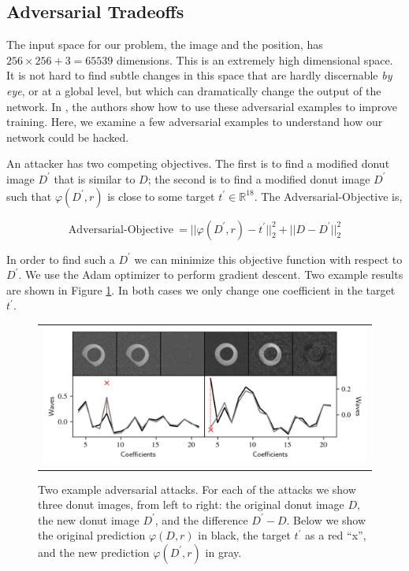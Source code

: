 \subsection{Adversarial Tradeoffs}

The input space for our problem, the image and the position, has $256 \times 256 + 3 = 65539$ dimensions. This is an extremely high dimensional space. It is not hard to find subtle changes in this space that are hardly discernable \textit{by eye}, or at a global level, but which can dramatically change the output of the network. In \cite{2014arXiv1412.6572G}, the authors show how to use these adversarial examples to improve training. Here, we examine a few adversarial examples to understand how our network could be hacked. 

An attacker has two competing objectives. The first is to find a modified donut image $D^\prime$ that is similar to $D$; the second is to find a modified donut image $D^\prime$ such that $\varphi(D^\prime, r)$ is close to some target $t^\prime \in \mathbb{R}^{18}$. The Adversarial-Objective is,

\begin{equation*}
\text{Adversarial-Objective}\ = ||\varphi(D^\prime, r) - t^\prime||_2^2 + ||D - D^\prime||_2^2
\end{equation*}

\noindent In order to find such a $D^\prime$ we can minimize this objective function with respect to $D^\prime$. We use the Adam optimizer to perform gradient descent. Two example results are shown in Figure \ref{fig:adversarial}. In both cases we only change one coefficient in the target $t^\prime$. 

\begin{figure}[!htbp]
\begin{center}
\begin{tabular}{c}
\includegraphics[width=\textwidth]{figs/cnn/adversarial.png}
\end{tabular}
\end{center}
\caption[Adversarial Attack]{Two example adversarial attacks. For each of the attacks we show three donut images, from left to right: the original donut image $D$, the new donut image $D^\prime$, and the difference $D^\prime - D$. Below we show the original prediction $\varphi(D,r)$ in black, the target $t^\prime$ as a red ``x'', and the new prediction $\varphi(D^\prime, r)$ in gray.\label{fig:adversarial}}
\end{figure}

